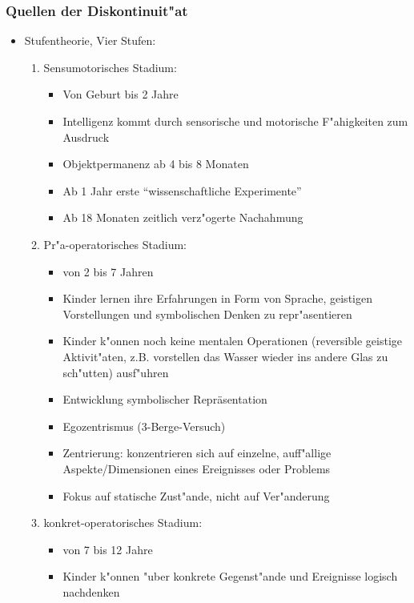 \subsubsection{Quellen der Diskontinuit"at}
\begin{itemize}
	\item
		Stufentheorie, Vier Stufen:
		\begin{enumerate}
			\item
				Sensumotorisches Stadium:
				\begin{itemize}
					\item
						Von Geburt bis 2 Jahre
					\item
						Intelligenz kommt durch sensorische und motorische F"ahigkeiten zum Ausdruck
					\item
						Objektpermanenz ab 4 bis 8 Monaten
					\item
						Ab 1 Jahr erste \enquote{wissenschaftliche Experimente}
					\item
						Ab 18 Monaten zeitlich verz"ogerte Nachahmung
				\end{itemize}
			\item
				Pr"a-operatorisches Stadium:
				\begin{itemize}
					\item
						von 2 bis 7 Jahren
					\item
						Kinder lernen ihre Erfahrungen in Form von Sprache, geistigen Vorstellungen und symbolischen Denken zu repr"asentieren
					\item
						Kinder k"onnen noch keine mentalen Operationen (reversible geistige Aktivit"aten, z.B. vorstellen das Wasser wieder ins andere Glas zu sch"utten) ausf"uhren
					\item
						Entwicklung symbolischer Repräsentation
					\item
						Egozentrismus (3-Berge-Versuch)
					\item
						Zentrierung: konzentrieren sich auf einzelne, auff"allige Aspekte/Dimensionen eines Ereignisses oder Problems
					\item
						Fokus auf statische Zust"ande, nicht auf Ver"anderung
				\end{itemize}
			\item
				konkret-operatorisches Stadium:
				\begin{itemize}
					\item
						von 7 bis 12 Jahre
					\item
						Kinder k"onnen "uber konkrete Gegenst"ande und Ereignisse logisch nachdenken

\end{itemize}
\end{enumerate}
\end{itemize}

